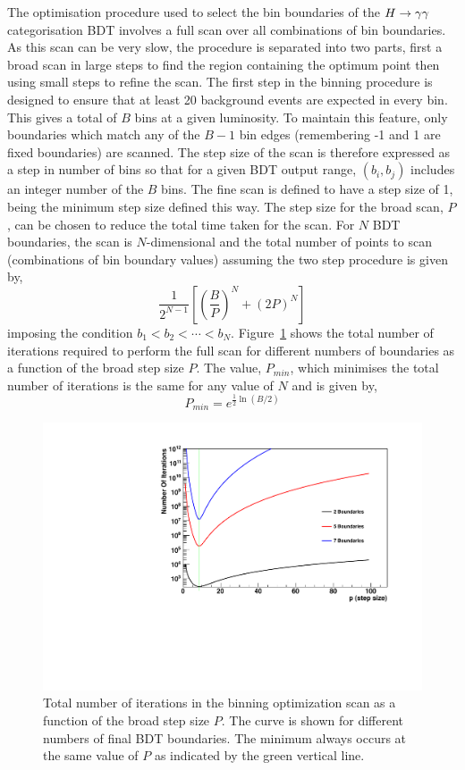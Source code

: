 The optimisation procedure used to select the bin boundaries of the $H\rightarrow\gamma\gamma$ categorisation BDT 
involves a full scan over all combinations of bin boundaries. As this scan can be
very slow, the procedure is separated into two parts, first a broad scan in large steps 
to find the region containing the optimum point then using small steps to refine the scan.
The first step in the binning procedure is designed to ensure that at least 20 background 
events are expected in every bin. This gives a total of $B$ bins at a given luminosity.
To maintain this feature, only boundaries which match any of the $B-1$ bin edges (remembering
-1 and 1 are fixed boundaries) are scanned. The step size of the scan is therefore expressed
as a step in number of bins so that for a given BDT output range, $(b_{i},b_{j})$ includes
an integer number of the $B$ bins. The fine scan is defined to have a step size of 1,
being the minimum step size defined this way. The step size for the broad scan, $P$,
can be chosen to reduce the total time taken for the scan.
For $N$ BDT boundaries, the scan is $N$-dimensional and the total number of points to scan 
(combinations of bin boundary values) assuming the two step procedure is given by,
\begin{equation}
	\frac{\displaystyle 1}{\displaystyle 2^{N-1}} \left[ \left(\frac{\displaystyle B}{\displaystyle P}\right)^{N}
	+ (2P)^{N}\right]
\end{equation}
imposing the condition $b_{1}<b_{2}<\cdots<b_{N}$.
Figure~\ref{fig:pmin} shows the total number of iterations required to perform 
the full scan for different numbers of boundaries as a function of the broad step size
$P$. The value, $P_{min}$, which minimises the total number of iterations
is the same for any value of $N$ and is given by,
\begin{equation}
	P_{min} = e^{\frac{1}{2}\ln(B/2)}
\end{equation}
\begin{figure}
\begin{center}
  \includegraphics[width=.8\textwidth]{hgg7TeV/appendix/minimumtime.pdf}
\end{center}
 \caption{Total number of iterations in the binning optimization scan as a function of the broad step size $P$.
 The curve is shown for different numbers of final BDT boundaries. The minimum always occurs at the same 
 value of $P$ as indicated by the green vertical line.}
 \label{fig:pmin}
\end{figure}
